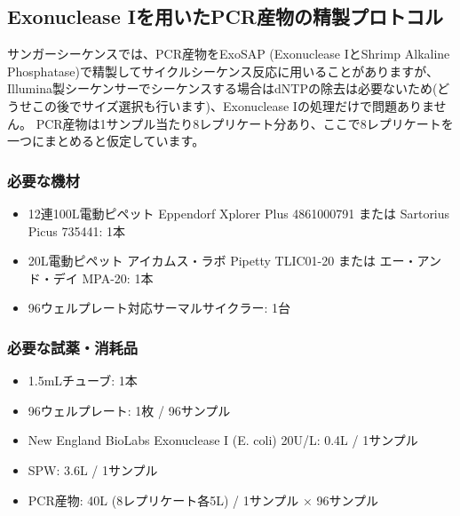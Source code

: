 \documentclass[titlepage,10pt,a4paper,uplatex]{jsbook}
\begin{document}
\subsection{Exonuclease Iを用いたPCR産物の精製プロトコル}

サンガーシーケンスでは、PCR産物をExoSAP (Exonuclease IとShrimp Alkaline Phosphatase)で精製してサイクルシーケンス反応に用いることがありますが、Illumina製シーケンサーでシーケンスする場合はdNTPの除去は必要ないため(どうせこの後でサイズ選択も行います)、Exonuclease Iの処理だけで問題ありません。
PCR産物は1サンプル当たり8レプリケート分あり、ここで8レプリケートを一つにまとめると仮定しています。

\subsubsection{必要な機材}
\begin{itemize}
\item 12連100{\textmu}L電動ピペット Eppendorf Xplorer Plus 4861000791 または Sartorius Picus 735441: 1本
\item 20{\textmu}L電動ピペット アイカムス・ラボ Pipetty TLIC01-20 または エー・アンド・デイ MPA-20: 1本
\item 96ウェルプレート対応サーマルサイクラー: 1台
\end{itemize}

\subsubsection{必要な試薬・消耗品}
\begin{itemize}
\item 1.5mLチューブ: 1本
\item 96ウェルプレート: 1枚 / 96サンプル
\item New England BioLabs Exonuclease I (E. coli) 20U/{\textmu}L: 0.4{\textmu}L / 1サンプル
\item SPW: 3.6{\textmu}L / 1サンプル
\item PCR産物: 40{\textmu}L (8レプリケート各5{\textmu}L) / 1サンプル × 96サンプル
\end{itemize}
\end{document}
